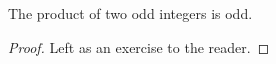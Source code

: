 \guard



\begin{prop}
\label{prop:productOfOddIsOdd}
  The product of two odd integers is odd.
\end{prop}
\begin{proof}
  Left as an exercise to the reader.
\end{proof}
